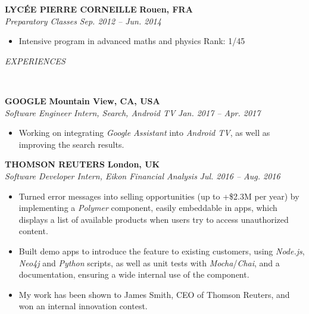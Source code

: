 \documentclass[a4paper, 12pt]{article}
\newcommand{\marginline}{-0.3cm}
\newcommand{\margincontent}{-0.6cm}
\newcommand{\marginbeforesection}{0.3cm}
\newcommand{\linewidthperso}{0.02cm}
\newcommand{\stylesection}[1]{
  \vspace{\marginbeforesection}
  \begin{normalsize}\textit{#1}\end{normalsize}
  \vspace{\marginline}\\
  \noindent\makebox[\linewidth]{\rule{\textwidth}{\linewidthperso}}

}
\newcommand{\styletitle}[1]{\textbf{#1}}
\newcommand{\styledesc}[1]{\textit{#1}}
\newcommand{\styleloc}[1]{\textbf{#1}}
\newcommand{\styledates}[1]{\textit{#1}}
\begin{document}
\begin{footnotesize}
\styletitle{LYC\'EE PIERRE CORNEILLE} \hfill \styleloc{Rouen, FRA}\\
\styledesc{Preparatory Classes} \hfill \styledates{Sep. 2012 -- Jun. 2014}\\
\vspace{\margincontent}
\begin{itemize}
  \item Intensive program in advanced maths and physics \hfill Rank: 1/45
\end{itemize}

\stylesection{EXPERIENCES}

\styletitle{GOOGLE} \hfill \styleloc{Mountain View, CA, USA}\\ 
\styledesc{Software Engineer Intern, Search, Android TV} \hfill \styledates{Jan. 2017 -- Apr. 2017}\\
\vspace{\margincontent}
\begin{itemize}
  \item Working on integrating \textit{Google Assistant} into \textit{Android TV}, as well as improving the search results.
\end{itemize}

\styletitle{THOMSON REUTERS} \hfill \styleloc{London, UK}\\ 
\styledesc{Software Developer Intern, Eikon Financial Analysis} \hfill \styledates{Jul. 2016 -- Aug. 2016}\\
\vspace{\margincontent}
\begin{itemize}
  \item Turned error messages into selling opportunities (up to +\$2.3M per year) by implementing a \textit{Polymer} component, easily embeddable in apps, which displays a list of available products when users try to access unauthorized content.
  \item Built demo apps to introduce the feature to existing customers, using \textit{Node.js}, \textit{Neo4j} and \textit{Python} scripts, as well as unit tests with \textit{Mocha}/\textit{Chai}, and a documentation, ensuring a wide internal use of the component.
  \item My work has been shown to James Smith, CEO of Thomson Reuters, and won an internal innovation contest.
\end{itemize}


\end{footnotesize}
\end{document}
